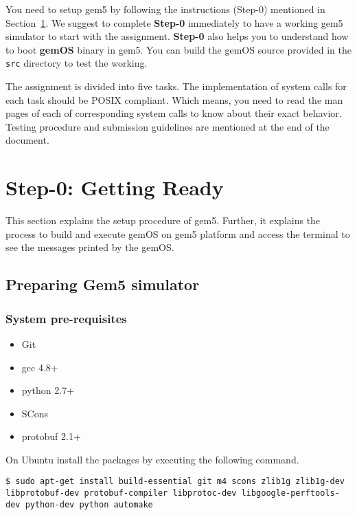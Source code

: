 \documentclass[12pt]{article}
\begin{document}
You need to setup gem5 by following the instructions (Step-0) mentioned in Section~\ref{sec:s0}. 
We suggest to complete \textbf{Step-0} immediately to have a working gem5 simulator to start with 
the assignment. \textbf{Step-0} also helps you to understand how to boot \textbf{gemOS} binary in gem5. 
You can build the gemOS source provided in the {\tt src} directory to test the working. 

The assignment is divided into five tasks. The implementation of system calls for each task should be POSIX compliant. 
Which means, you need to read the man pages of each of corresponding system calls to know about their exact behavior. 
Testing procedure and submission guidelines are mentioned at the end of the document. 

\section{Step-0: Getting Ready}
\label{sec:s0}

This section explains the setup procedure of gem5. Further, it explains the process to build and execute gemOS 
on gem5 platform and access the terminal to see the messages printed by the gemOS.

\subsection{Preparing Gem5 simulator}
\subsubsection*{System pre-requisites}
\begin{itemize}
    \item Git
    \item gcc 4.8+
    \item python 2.7+
    \item SCons
    \item protobuf 2.1+
\end{itemize}
\begin{flushleft}
On Ubuntu install the packages by executing the following command. 

\vspace{0.25cm}
\noindent
\texttt{\$ sudo apt-get install build-essential git m4 scons zlib1g zlib1g-dev libprotobuf-dev protobuf-compiler libprotoc-dev  libgoogle-perftools-dev python-dev python automake}
\end{flushleft} 
\vspace{5mm}
\end{document}
